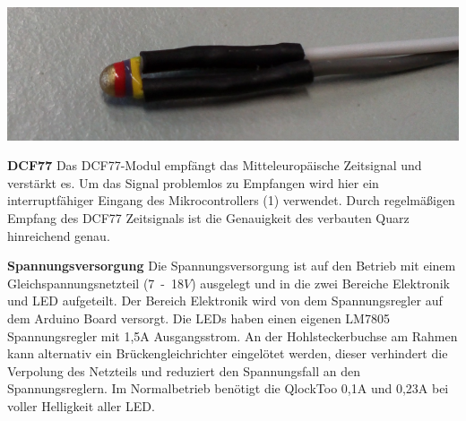 \begin{multicols}{2}
{}

{
\centering
\includegraphics[width=0.9\columnwidth]{Abbildungen/Elektronik/NTC} 

}

\textbf{DCF77} Das DCF77-Modul empfängt das Mitteleuropäische Zeitsignal und verstärkt es. Um das Signal problemlos zu Empfangen wird hier ein interruptfähiger Eingang des Mikrocontrollers (1) verwendet. Durch regelmäßigen Empfang des DCF77 Zeitsignals ist die Genauigkeit des verbauten Quarz hinreichend genau.\newline

\textbf{Spannungsversorgung} Die Spannungsversorgung ist auf den Betrieb mit einem Gleichspannungsnetzteil (7~-~18$V$) ausgelegt und in die zwei Bereiche Elektronik und LED aufgeteilt. Der Bereich Elektronik wird von dem Spannungsregler auf dem Arduino Board versorgt. Die LEDs haben einen eigenen LM7805 Spannungsregler mit 1,5A Ausgangsstrom. An der Hohlsteckerbuchse am Rahmen kann alternativ ein Brückengleichrichter eingelötet werden, dieser verhindert die Verpolung des Netzteils und reduziert den Spannungsfall an den Spannungsreglern. Im Normalbetrieb benötigt die QlockToo 0,1A und 0,23A bei voller Helligkeit aller LED. 

\end{multicols}


